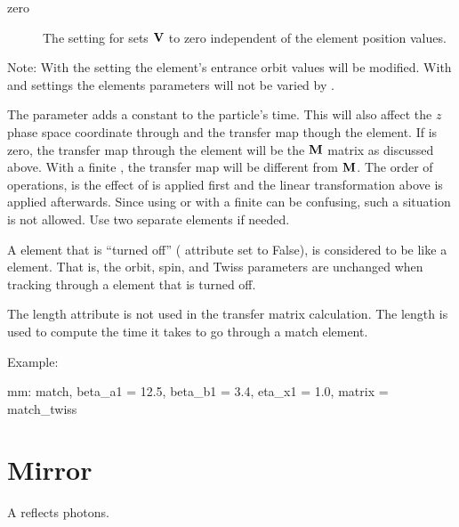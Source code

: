 {\begin{description}
%
\item[zero] \Newline
The  setting for  sets ${\bf V}$ to zero independent of the element position values.
%
\end{description}

\newpage

Note: With the  setting the element's entrance orbit values will be modified. With
 and  settings the elements parameters will not be varied by \bmad.

The  parameter adds a constant to the particle's time. This will also affect the $z$
phase space coordinate through  and the transfer map though the element. If
 is zero, the transfer map through the element will be the ${\bf M}$ matrix as
discussed above. With a finite , the transfer map will be different from ${\bf M}$.
The order of operations, is the effect of  is applied first and the linear
transformation above is applied afterwards. Since using  or  with
a finite  can be confusing, such a situation is not allowed. Use two separate
 elements if needed.

A  element that is ``turned off'' ( attribute set to False), is considered to be
like a  element. That is, the orbit, spin, and Twiss parameters are unchanged when tracking
through a  element that is turned off.

The length attribute  is not used in the transfer matrix calculation. The length  is
used to compute the time it takes to go through a match element.

Example:
\begin{example}
  mm: match, beta_a1 = 12.5, beta_b1 = 3.4, eta_x1 = 1.0, matrix = match_twiss
\end{example}

\newpage

\section{Mirror}
\label{s:mirror}

A  reflects photons. 

}
